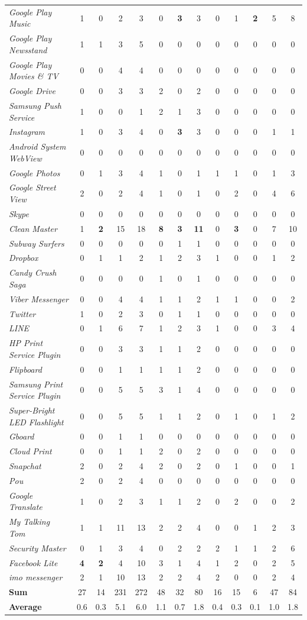 \documentclass[sigconf,review, anonymous]{acmart}
\begin{document}
\begin{table} [htbp]
\begin{tabular}{|l|cccc|ccc|ccccc|}
{\it Google Play Music}&1&0&2&3&0&{\bf 3}&3&0&1&{\bf 2}&5&8\\
{\it Google Play Newsstand}&1&1&3&5&0&0&0&0&0&0&0&0\\
{\it Google Play Movies \& TV}&0&0&4&4&0&0&0&0&0&0&0&0\\
{\it Google Drive}&0&0&3&3&2&0&2&0&0&0&0&0\\
{\it Samsung Push Service}&1&0&0&1&2&1&3&0&0&0&0&0\\
{\it Instagram}&1&0&3&4&0&{\bf 3}&3&0&0&0&1&1\\
{\it Android System WebView}&0&0&0&0&0&0&0&0&0&0&0&0\\
{\it Google Photos}&0&1&3&4&1&0&1&1&1&0&1&3\\
{\it Google Street View}&2&0&2&4&1&0&1&0&2&0&4&6\\
{\it Skype}&0&0&0&0&0&0&0&0&0&0&0&0\\
{\it Clean Master}&1&{\bf 2}&15&18&{\bf 8}&{\bf 3}&{\bf 11}&0&{\bf 3}&0&7&10\\
{\it Subway Surfers}&0&0&0&0&0&1&1&0&0&0&0&0\\
{\it Dropbox}&0&1&1&2&1&2&3&1&0&0&1&2\\
{\it Candy Crush Saga}&0&0&0&0&1&0&1&0&0&0&0&0\\
{\it Viber Messenger}&0&0&4&4&1&1&2&1&1&0&0&2\\
{\it Twitter}&1&0&2&3&0&1&1&0&0&0&0&0\\
{\it LINE}&0&1&6&7&1&2&3&1&0&0&3&4\\
{\it HP Print Service Plugin}&0&0&3&3&1&1&2&0&0&0&0&0\\
{\it Flipboard}&0&0&1&1&1&1&2&0&0&0&0&0\\
{\it Samsung Print Service Plugin}&0&0&5&5&3&1&4&0&0&0&0&0\\
{\it Super-Bright LED Flashlight}&0&0&5&5&1&1&2&0&1&0&1&2\\
{\it Gboard}&0&0&1&1&0&0&0&0&0&0&0&0\\
{\it Cloud Print}&0&0&1&1&2&0&2&0&0&0&0&0\\
{\it Snapchat}&2&0&2&4&2&0&2&0&1&0&0&1\\
{\it Pou}&2&0&2&4&0&0&0&0&0&0&0&0\\
{\it Google Translate}&1&0&2&3&1&1&2&0&2&0&0&2\\
{\it My Talking Tom}&1&1&11&13&2&2&4&0&0&1&2&3\\
{\it Security Master}&0&1&3&4&0&2&2&2&1&1&2&6\\
{\it Facebook Lite}&{\bf 4}&{\bf 2}&4&10&3&1&4&1&2&0&2&5\\
{\it imo messenger}&2&1&10&13&2&2&4&2&0&0&2&4\\
\hline
{\bf Sum}&27&14&231&272&48&32&80&16&15&6&47&84\\
\hline
{\bf Average}&0.6&0.3&5.1&6.0&1.1&0.7&1.8&0.4&0.3&0.1&1.0&1.8\\
\hline
\end{tabular}\label{tab_result}
\end{table}
\end{document}
